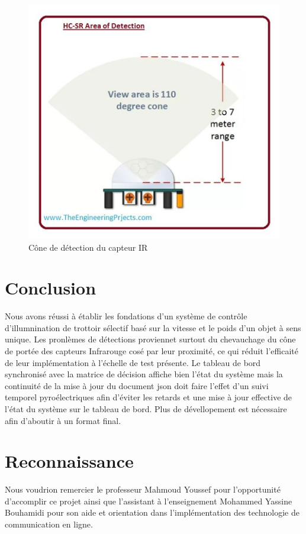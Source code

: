 \documentclass[journal]{IEEEtran}
\begin{document}
\begin{figure}[htbp]
    \centerline{\includegraphics[scale = 0.5]{IR_CONE.png}}
    \caption{Cône de détection du capteur IR}
    \label{fig8}
\end{figure} 

\section{Conclusion}
Nous avons réussi à établir les fondations d'un système de contrôle d'illumnination de trottoir sélectif basé sur la vitesse et le poids d'un objet à sens unique.
Les pronlèmes de détections proviennet surtout du chevauchage du cône de portée des capteurs Infrarouge cosé par leur proximité, ce qui réduit l'efficaité de leur implémentation à l'échelle
de test présente. Le tableau de bord synchronisé avec la matrice de décision affiche bien l'état du système mais la continuité de la mise à jour du document json doit faire l'effet d'un suivi temporel pyroélectriques
afin d'éviter les retards et une mise à jour effective de l'état du système sur le tableau de bord. Plus de dévellopement est nécessaire afin d'aboutir  à un format final.
\section*{Reconnaissance}

Nous voudrion remercier le professeur Mahmoud Youssef pour l'opportunité d'accomplir ce projet ainsi
que l'assistant à l'enseignement Mohammed Yassine Bouhamidi pour son aide et orientation dans l'implémentation des technologie de communication en ligne.
\end{document}
